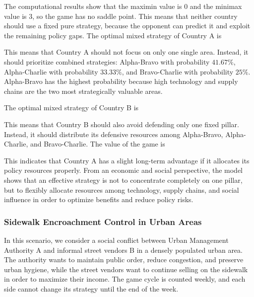 \documentclass[12pt,a4paper]{article}
\begin{document}
The computational results show that the maximin value is $0$ and the minimax value is $3$, so the game has no saddle point. This means that neither country should use a fixed pure strategy, because the opponent can predict it and exploit the remaining policy gaps. The optimal mixed strategy of Country A is

\noindent{}

This means that Country A should not focus on only one single area. Instead, it should prioritize combined strategies: Alpha-Bravo with probability $41.67\%$, Alpha-Charlie with probability $33.33\%$, and Bravo-Charlie with probability $25\%$. Alpha-Bravo has the highest probability because high technology and supply chains are the two most strategically valuable areas.

The optimal mixed strategy of Country B is

\noindent{}


This means that Country B should also avoid defending only one fixed pillar. Instead, it should distribute its defensive resources among Alpha-Bravo, Alpha-Charlie, and Bravo-Charlie. The value of the game is

\noindent{}

This indicates that Country A has a slight long-term advantage if it allocates its policy resources properly. From an economic and social perspective, the model shows that an effective strategy is not to concentrate completely on one pillar, but to flexibly allocate resources among technology, supply chains, and social influence in order to optimize benefits and reduce policy risks.

\subsubsection{Sidewalk Encroachment Control in Urban Areas}

In this scenario, we consider a social conflict between Urban Management Authority A and informal street vendors B in a densely populated urban area. The authority wants to maintain public order, reduce congestion, and preserve urban hygiene, while the street vendors want to continue selling on the sidewalk in order to maximize their income. The game cycle is counted weekly, and each side cannot change its strategy until the end of the week.
\end{document}
